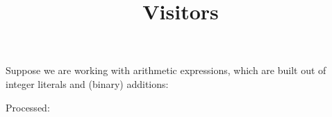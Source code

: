 \documentclass[onecolumn,11pt,nocopyrightspace]{sigplanconf}
\title{Visitors}
\begin{document}
\maketitle


\clearpage
\tableofcontents
\clearpage


Suppose we are working with arithmetic expressions, which are built out of
integer literals and (binary) additions:

Processed:
\end{document}
